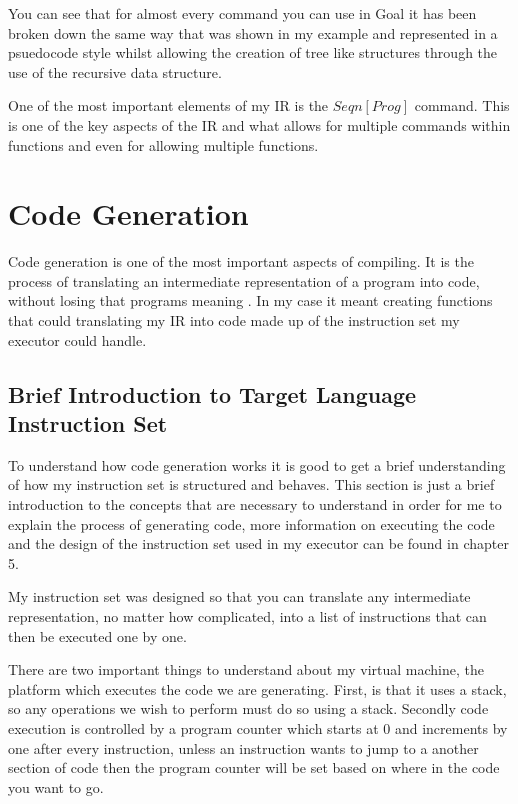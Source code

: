 You can see that for almost every command you can use in Goal it has been broken down the same way that was shown in my example and represented in a psuedocode style whilst allowing the creation of tree like structures through the use of the recursive data structure.

One of the most important elements of my IR is the $Seqn [Prog]$ command. This is one of the key aspects of the IR and what allows for multiple commands within functions and even for allowing multiple functions.

\section{Code Generation}

Code generation is one of the most important aspects of compiling. It is the process of translating an intermediate representation of a program into code, without losing that programs meaning \cite[p.~138]{IntroComp1990}. In my case it meant creating functions that could translating my IR into code made up of the instruction set my executor could handle.  


\subsection{Brief Introduction to Target Language Instruction Set}

To understand how code generation works it is good to get a brief understanding of how my instruction set is structured and behaves. This section is just a brief introduction to the concepts that are necessary to understand in order for me to explain the process of generating code, more information on executing the code and the design of the instruction set used in my executor can be found in chapter 5.

My instruction set was designed so that you can translate any intermediate representation, no matter how complicated, into a list of instructions that can then be executed one by one. 

There are two important things to understand about my virtual machine, the platform which executes the code we are generating. First, is that it uses a stack, so any operations we wish to perform must do so using a stack. Secondly code execution is controlled by a program counter which starts at 0 and increments by one after every instruction, unless an instruction wants to jump to a another section of code then the program counter will be set based on where in the code you want to go. 

